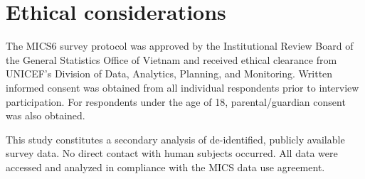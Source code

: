 \section{Ethical considerations}

The MICS6 survey protocol was approved by the Institutional Review Board of the General Statistics Office of Vietnam and received ethical clearance from UNICEF's Division of Data, Analytics, Planning, and Monitoring. Written informed consent was obtained from all individual respondents prior to interview participation. For respondents under the age of 18, parental/guardian consent was also obtained.

This study constitutes a secondary analysis of de-identified, publicly available survey data. No direct contact with human subjects occurred. All data were accessed and analyzed in compliance with the MICS data use agreement.